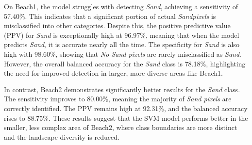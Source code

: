 \documentclass[a4paper,12pt]{article}
\begin{document}
On Beach1, the model struggles with detecting \textit{Sand}, achieving a sensitivity of 57.40\%. This indicates that a significant portion of actual \textit{Sandpixels} is misclassified into other categories. Despite this, the positive predictive value (PPV) for \textit{Sand} is exceptionally high at 96.97\%, meaning that when the model predicts \textit{Sand}, it is accurate nearly all the time. The specificity for \textit{Sand} is also high with 98.60\%, showing that \textit{No-Sand pixels} are rarely misclassified as \textit{Sand}. However, the overall balanced accuracy for the \textit{Sand} class is 78.18\%, highlighting the need for improved detection in larger, more diverse areas like Beach1.

In contrast, Beach2 demonstrates significantly better results for the \textit{Sand} class. The sensitivity improves to 80.00\%, meaning the majority of \textit{Sand pixels} are correctly identified. The PPV remains high at 92.31\%, and the balanced accuracy rises to 88.75\%. These results suggest that the SVM model performs better in the smaller, less complex area of Beach2, where class boundaries are more distinct and the landscape diversity is reduced.
\end{document}
